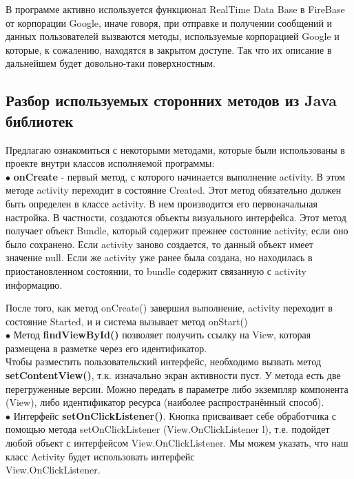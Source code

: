 \documentclass[utf8,14pt,a4paper,oneside,russian]{book}
\begin{document}
	В программе активно используется функционал RealTime Data Base в FireBase от корпорации Google, иначе говоря, при отправке и получении сообщений и данных пользователей вызваются методы, используемые корпорацией Google и которые, к сожалению, находятся в закрытом доступе. Так что их описание в дальнейшем будет довольно-таки поверхностным.
	
	\subsection{Разбор используемых сторонних методов из Java библиотек}
	
	Предлагаю ознакомиться с некоторыми методами, которые были использованы в проекте внутри классов исполняемой программы:\\
	
	$\bullet$ \textbf{onCreate} - первый метод, с которого начинается выполнение activity. В этом методе activity переходит в состояние Created. Этот метод обязательно должен быть определен в классе activity. В нем производится его первоначальная настройка. В частности, создаются объекты визуального интерфейса. Этот метод получает объект Bundle, который содержит прежнее состояние activity, если оно было сохранено. Если activity заново создается, то данный объект имеет значение null. Если же activity уже ранее была создана, но находилась в приостановленном состоянии, то bundle содержит связанную с activity информацию.
	
	После того, как метод onCreate() завершил выполнение, activity переходит в состояние Started, и и система вызывает метод onStart()\\
	
	$\bullet$ Метод \textbf{findViewById()} позволяет получить ссылку на View, которая размещена в разметке через его идентификатор.\\
	
	Чтобы разместить пользовательский интерфейс, необходимо вызвать метод \textbf{setContentView()}, т.к. изначально экран активности пуст. У метода есть две перегруженные версии. Можно передать в параметре либо экземпляр компонента (View), либо идентификатор ресурса (наиболее распространённый способ).\\

	$\bullet$ Интерфейс \textbf{setOnClickListener()}. Кнопка присваивает себе обработчика с помощью метода setOnClickListener (View.OnClickListener l), т.е. подойдет любой объект с интерфейсом View.OnClickListener. Мы можем указать, что наш класс Activity будет использовать интерфейс \\View.OnClickListener.\\
	
\end{document}
